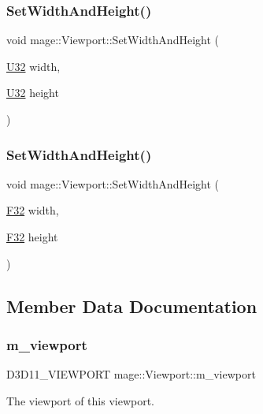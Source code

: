 \hypertarget{classmage_1_1_viewport_ab3b8cdbc0b6b6e1c34bab0a4f05e0d52}{}\label{classmage_1_1_viewport_ab3b8cdbc0b6b6e1c34bab0a4f05e0d52} 
\subsubsection{\texorpdfstring{Set\+Width\+And\+Height()}{SetWidthAndHeight()}\hspace{0.1cm}{\footnotesize\ttfamily [1/2]}}
{\footnotesize\ttfamily void mage\+::\+Viewport\+::\+Set\+Width\+And\+Height (\begin{DoxyParamCaption}\item[{\hyperlink{namespacemage_a41c104c036fba3756a74e19f793eeaa1}{U32}}]{width,  }\item[{\hyperlink{namespacemage_a41c104c036fba3756a74e19f793eeaa1}{U32}}]{height }\end{DoxyParamCaption})\hspace{0.3cm}{\ttfamily [noexcept]}}

\hypertarget{classmage_1_1_viewport_ab45df0ab7757f95d825fd724db663af5}{}\label{classmage_1_1_viewport_ab45df0ab7757f95d825fd724db663af5} 
\subsubsection{\texorpdfstring{Set\+Width\+And\+Height()}{SetWidthAndHeight()}\hspace{0.1cm}{\footnotesize\ttfamily [2/2]}}
{\footnotesize\ttfamily void mage\+::\+Viewport\+::\+Set\+Width\+And\+Height (\begin{DoxyParamCaption}\item[{\hyperlink{namespacemage_aa97e833b45f06d60a0a9c4fc22ae02c0}{F32}}]{width,  }\item[{\hyperlink{namespacemage_aa97e833b45f06d60a0a9c4fc22ae02c0}{F32}}]{height }\end{DoxyParamCaption})\hspace{0.3cm}{\ttfamily [noexcept]}}



\subsection{Member Data Documentation}
\hypertarget{classmage_1_1_viewport_a9509003aae2c6cd0f33cfc875cd235f4}{}\label{classmage_1_1_viewport_a9509003aae2c6cd0f33cfc875cd235f4} 
\subsubsection{\texorpdfstring{m\+\_\+viewport}{m\_viewport}}
{\footnotesize\ttfamily D3\+D11\+\_\+\+V\+I\+E\+W\+P\+O\+RT mage\+::\+Viewport\+::m\+\_\+viewport\hspace{0.3cm}{\ttfamily [private]}}

The viewport of this viewport. 